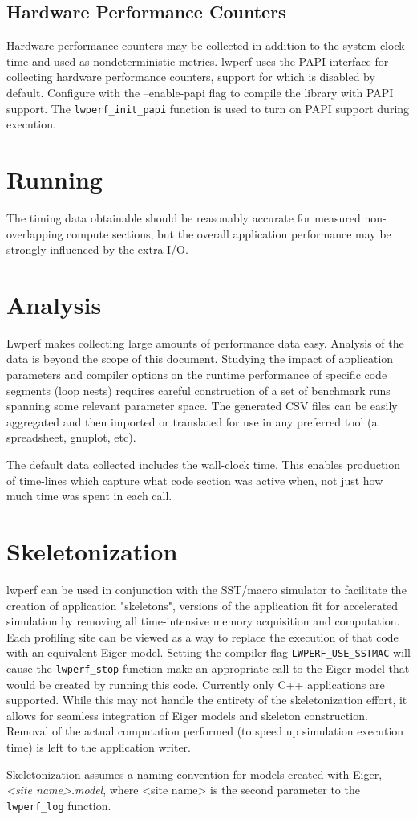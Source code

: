 \documentclass{article}
\begin{document}
\subsection{Hardware Performance Counters}
Hardware performance counters may be collected in addition to the system clock time and used as nondeterministic metrics. lwperf uses the PAPI interface for collecting hardware performance counters, support for which is disabled by default. Configure with the --enable-papi flag to compile the library with PAPI support. The \texttt{lwperf\_init\_papi} function is used to turn on PAPI support during execution.

\section{Running}
\label{sec:running}
The timing data obtainable should be reasonably accurate for measured non-overlapping compute sections, but the overall application performance may be strongly influenced by the extra I/O.

\section{Analysis}
Lwperf makes collecting large amounts of performance data easy. Analysis of the data is beyond the scope of this document. Studying the impact of application parameters and compiler options on the runtime performance of specific code segments (loop nests) requires careful construction of a set of benchmark runs spanning some relevant parameter space. The generated CSV files can be easily aggregated and then imported or translated for use in any preferred tool (a spreadsheet, gnuplot, etc).

The default data collected includes the wall-clock time. This enables production of time-lines which capture what code section was active when, not just how much time was spent in each call.

\section{Skeletonization}
lwperf can be used in conjunction with the SST/macro simulator to facilitate the creation of application "skeletons", versions of the application fit for accelerated simulation by removing all time-intensive memory acquisition and computation. Each profiling site can be viewed as a way to replace the execution of that code with an equivalent Eiger model. Setting the compiler flag \texttt{LWPERF\_USE\_SSTMAC} will cause the \texttt{lwperf\_stop} function make an appropriate call to the Eiger model that would be created by running this code. Currently only C++ applications are supported. While this may not handle the entirety of the skeletonization effort, it allows for seamless integration of Eiger models and skeleton construction. Removal of the actual computation performed (to speed up simulation execution time) is left to the application writer.

Skeletonization assumes a naming convention for models created with Eiger, \textit{<site name>.model}, where <site name> is the second parameter to the \texttt{lwperf\_log} function.
\end{document}
